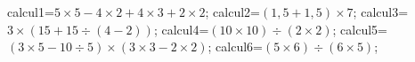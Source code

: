 \documentclass[exercice]{thedocument}%
\begin{document}
%
    \>calcul1=$5\times5-4\times2+4\times3+2\times2$;%
    \>calcul2=$(1,5+1,5)\times7$;%
    \>calcul3=$3\times(15+15\div(4-2))$;%
    \>calcul4=$(10\times10)\div(2\times2)$;%
    \>calcul5=$(3\times5-10\div5)\times(3\times3-2\times2)$;%
    \>calcul6=$(5\times6)\div(6\times5)$;%
\end{document}
